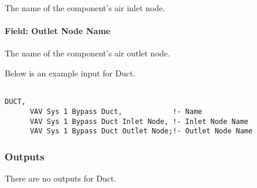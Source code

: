 The name of the component's air inlet node.

\paragraph{Field: Outlet Node Name}\label{field-outlet-node-name-2-000}

The name of the component's air outlet node.

Below is an example input for Duct.

\begin{lstlisting}

DUCT,
      VAV Sys 1 Bypass Duct,            !- Name
      VAV Sys 1 Bypass Duct Inlet Node, !- Inlet Node Name
      VAV Sys 1 Bypass Duct Outlet Node;!- Outlet Node Name
\end{lstlisting}

\subsubsection{Outputs}\label{outputs-10-004}

There are no outputs for Duct.